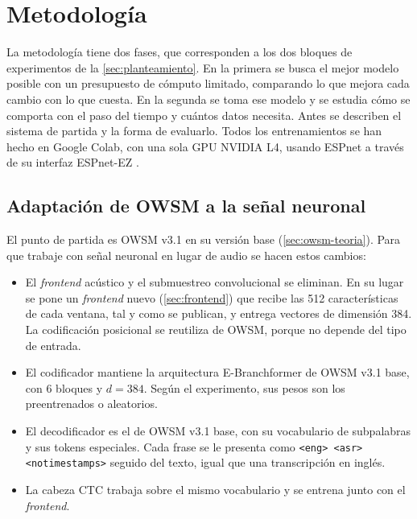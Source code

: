 
\chapter{Metodología}
\label{cap:metodologia}

La metodología tiene dos fases, que corresponden a los dos bloques de experimentos de la \cref{sec:planteamiento}. En la primera se busca el mejor modelo posible con un presupuesto de cómputo limitado, comparando lo que mejora cada cambio con lo que cuesta. En la segunda se toma ese modelo y se estudia cómo se comporta con el paso del tiempo y cuántos datos necesita. Antes se describen el sistema de partida y la forma de evaluarlo. Todos los entrenamientos se han hecho en Google Colab, con una sola GPU NVIDIA L4, usando ESPnet a través de su interfaz ESPnet-EZ \cite{watanabe2018espnet,someki2024espnetez}.

\section{Adaptación de OWSM a la señal neuronal}
\label{sec:adaptacion-modalidad}

El punto de partida es OWSM v3.1 en su versión base (\cref{sec:owsm-teoria}). Para que trabaje con señal neuronal en lugar de audio se hacen estos cambios:

\begin{itemize}[leftmargin=*, itemsep=0.3em]
  \item El \textit{frontend} acústico y el submuestreo convolucional se eliminan. En su lugar se pone un \textit{frontend} nuevo (\cref{sec:frontend}) que recibe las 512 características de cada ventana, tal y como se publican, y entrega vectores de dimensión 384. La codificación posicional se reutiliza de OWSM, porque no depende del tipo de entrada.
  \item El codificador mantiene la arquitectura E-Branchformer de OWSM v3.1 base, con 6 bloques y $d = 384$. Según el experimento, sus pesos son los preentrenados o aleatorios.
  \item El decodificador es el de OWSM v3.1 base, con su vocabulario de subpalabras y sus tokens especiales. Cada frase se le presenta como \texttt{<eng> <asr> <notimestamps>} seguido del texto, igual que una transcripción en inglés.
  \item La cabeza CTC trabaja sobre el mismo vocabulario y se entrena junto con el \textit{frontend}.
\end{itemize}

